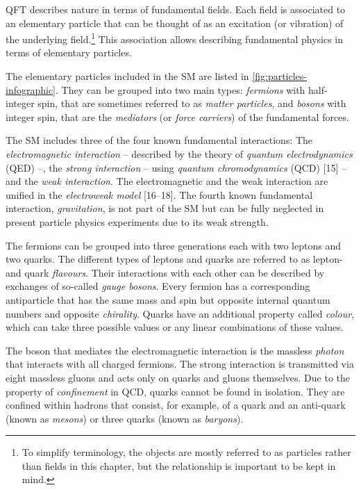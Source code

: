 QFT describes nature in terms of fundamental fields. Each field is associated to an elementary particle that can be thought of as an excitation (or vibration) of the underlying field.\footnote{To simplify terminology, the objects are mostly referred to as particles rather than fields in this chapter, but the relationship is important to be kept in mind.} This association allows describing fundamental physics in terms of elementary particles. 

The elementary particles included in the SM are listed in \cref{fig:particles-infographic}. They can be grouped into two main types: \emph{fermions} with half-integer spin, that are sometimes referred to as \emph{matter particles}, and \emph{bosons} with integer spin, that are the \emph{mediators} (or \emph{force carriers}) of the fundamental forces.

The SM includes three of the four known fundamental interactions: The \emph{electromagnetic interaction} -- described by the theory of \emph{quantum electrodynamics} (QED) --, the \emph{strong interaction} -- using \emph{quantum chromodynamics} (QCD) [15] -- and the \emph{weak interaction}. The electromagnetic and the weak interaction are unified in the \emph{electroweak model} [16–18]. The fourth known fundamental interaction, \emph{gravitation}, is not part of the SM but can be fully neglected in present particle physics experiments due to its weak strength.

The fermions can be grouped into three generations each with two leptons and two quarks. The different types of leptons and quarks are referred to as lepton- and quark \emph{flavours}.
Their interactions with each other can be described by exchanges of so-called \emph{gauge bosons}.
Every fermion has a corresponding antiparticle that has the same mass and spin but opposite internal quantum numbers and opposite \emph{chirality}.
Quarks have an additional property called \emph{colour}, which can take three possible values or any linear combinations of these values.

The boson that mediates the electromagnetic interaction is the massless \emph{photon} that interacts with all charged fermions.
The strong interaction is transmitted via eight massless gluons and acts only on quarks and gluons themselves.
Due to the property of \emph{confinement} in QCD, quarks cannot be found in isolation. They are confined within hadrons that consist, for example, of a quark and an anti-quark (known as \emph{mesons}) or three quarks (known as \emph{baryons}).

